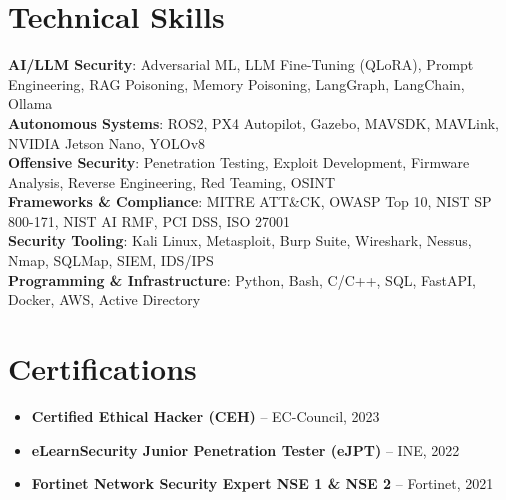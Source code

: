 \documentclass[letterpaper,11pt]{article}
\begin{document}
\section{Technical Skills}
 \begin{itemize}[leftmargin=0.15in, label={}]
    \small{\item{
     \textbf{AI/LLM Security}{: Adversarial ML, LLM Fine-Tuning (QLoRA), Prompt Engineering, RAG Poisoning, Memory Poisoning, LangGraph, LangChain, Ollama} \\
     \textbf{Autonomous Systems}{: ROS2, PX4 Autopilot, Gazebo, MAVSDK, MAVLink, NVIDIA Jetson Nano, YOLOv8} \\
     \textbf{Offensive Security}{: Penetration Testing, Exploit Development, Firmware Analysis, Reverse Engineering, Red Teaming, OSINT} \\
     \textbf{Frameworks \& Compliance}{: MITRE ATT\&CK, OWASP Top 10, NIST SP 800-171, NIST AI RMF, PCI DSS, ISO 27001} \\
     \textbf{Security Tooling}{: Kali Linux, Metasploit, Burp Suite, Wireshark, Nessus, Nmap, SQLMap, SIEM, IDS/IPS} \\
     \textbf{Programming \& Infrastructure}{: Python, Bash, C/C++, SQL, FastAPI, Docker, AWS, Active Directory}
    }}
 \end{itemize}

\section{Certifications}
  \begin{itemize}[leftmargin=0.15in, label={}]
    \small{\item{
      \begin{itemize}
          \item \textbf{Certified Ethical Hacker (CEH)} -- EC-Council, 2023
          \item \textbf{eLearnSecurity Junior Penetration Tester (eJPT)} -- INE, 2022
          \item \textbf{Fortinet Network Security Expert NSE 1 \& NSE 2} -- Fortinet, 2021
      \end{itemize}
    }}
  \end{itemize}

\end{document}
